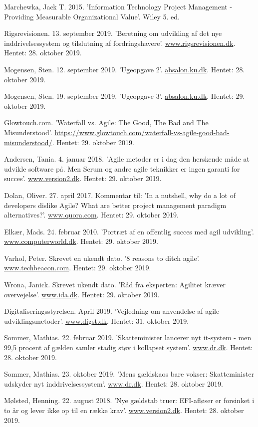 \begin{thebibliography}{9}
Marchewka, Jack T. 2015. 'Information Technology Project Management - Providing Measurable Organizational Value'. Wiley 5. ed.

Rigsrevisionen. 13. september 2019. 'Beretning om udvikling af det nye inddrivelsessystem og tilslutning af fordringshavere'. \url{www.rigsrevisionen.dk}. Hentet: 28. oktober 2019.

Mogensen, Sten. 12. september 2019. 'Ugeopgave 2'. \url{absalon.ku.dk}. Hentet: 28. oktober 2019.

Mogensen, Sten. 19. september 2019. 'Ugeopgave 3'. \url{absalon.ku.dk}. Hentet: 29. oktober 2019.

Glowtouch.com. 'Waterfall vs. Agile: The Good, The Bad and The Misunderstood'. \url{https://www.glowtouch.com/waterfall-vs-agile-good-bad-misunderstood/}. Hentet: 29. oktober 2019.

Andersen, Tania. 4. januar 2018. 'Agile metoder er i dag den herskende måde at udvikle software på. Men Scrum og andre agile teknikker er ingen garanti for succes'. \url{www.version2.dk}. Hentet: 29. oktober 2019.

Dolan, Oliver. 27. april 2017. Kommentar til: 'In a nutshell, why do a lot of developers dislike Agile? What are better project management paradigm alternatives?'. \url{www.quora.com}. Hentet: 29. oktober 2019.

Elkær, Mads. 24. februar 2010. 'Portræt af en offentlig succes med agil udvikling'. \url{www.computerworld.dk}. Hentet: 29. oktober 2019.

Varhol, Peter. Skrevet en ukendt dato. '8 reasons to ditch agile'. \url{www.techbeacon.com}. Hentet: 29. oktober 2019.

Wrona, Janick. Skrevet ukendt dato. 'Råd fra eksperten: Agilitet kræver overvejelse'. \url{www.ida.dk}. Hentet: 29. oktober 2019.

Digitaliseringsstyrelsen. April 2019. 'Vejledning om anvendelse af agile udviklingsmetoder'. \url{www.digst.dk}. Hentet: 31. oktober 2019.

Sommer, Mathias. 22. februar 2019. 'Skatteminister lancerer nyt it-system - men 99,5 procent af gælden samler stadig støv i kollapset system'. \url{www.dr.dk}. Hentet: 28. oktober 2019.

Sommer, Mathias. 23. oktober 2019. 'Mens gældskaos bare vokser: Skatteminister udskyder nyt inddrivelsessystem'. \url{www.dr.dk}. Hentet: 28. oktober 2019.

Mølsted, Henning. 22. august 2018. 'Nye gældstab truer: EFI-afløser er forsinket i to år og lever ikke op til en række krav'. \url{www.version2.dk}. Hentet: 28. oktober 2019.
\end{thebibliography}